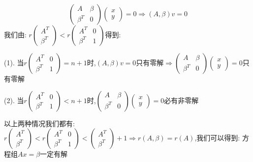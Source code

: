\begin{solution}

	$$\left( \begin{matrix}
		A&\beta\\\beta^T&0
	\end{matrix}\right)\left( \begin{matrix}
		x\\y
	\end{matrix}\right)=0\Rightarrow (A,\beta)v=0$$
	我们由:  $r\left( \begin{matrix}
		A^T\\\beta^T
	\end{matrix}\right)<r\left( \begin{matrix}
		A^T&0\\\beta^T&1
	\end{matrix}\right)$得到:  

	(1). 当$r\left( \begin{matrix}
		A^T&0\\\beta^T&1
	\end{matrix}\right)=n+1$时,$(A,\beta)v=0$只有零解$\Rightarrow \left( \begin{matrix}
	A&\beta\\\beta^T&0
\end{matrix}\right)\left( \begin{matrix}
x\\y
\end{matrix}\right)=0$只有零解

	(2). 当$r\left( \begin{matrix}
		A^T&0\\\beta^T&1
	\end{matrix}\right)<n+1$时,$\left( \begin{matrix}
	A&\beta\\\beta^T&0
\end{matrix}\right)\left( \begin{matrix}
x\\y
\end{matrix}\right)=0$必有非零解

	以上两种情况我们都有:  $r\left( \begin{matrix}
		A^T\\\beta^T
	\end{matrix}\right)<r\left( \begin{matrix}
		A^T&0\\\beta^T&1
	\end{matrix}\right)<\left( \begin{matrix}
	A^T\\\beta^T
\end{matrix}\right)+1\Rightarrow r(A,\beta)=r(A)$,我们可以得到:  方程组$Ax=\beta$一定有解
\end{solution}

